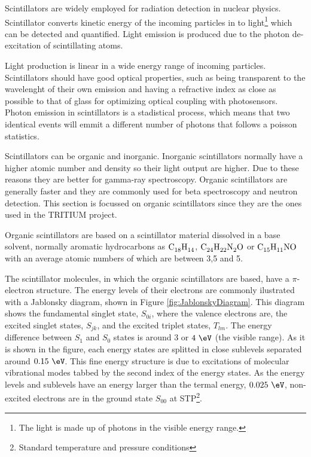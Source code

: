Scintillators are widely employed for radiation detection in nuclear physics. Scintillator converts kinetic energy of the incoming particles in to light\footnote{The light is made up of photons in the visible energy range.} which can be detected and quantified. Light emission is produced due to the photon de-excitation of scintillating atoms.

Light production is linear in a wide energy range of incoming particles. Scintillators should have good optical properties, such as being transparent to the wavelenght of their own emission and having a refractive index as close as possible to that of glass for optimizing optical coupling with photosensors. Photon emission in scintillators is a stadistical process, which means that two identical events will emmit a different number of photons that follows a poisson statistics.

Scintillators can be organic and inorganic. Inorganic scintillators normally have a higher atomic number and density so their light output are higher. Due to these reasons they are better for gamma-ray spectroscopy. Organic scintillators are generally faster and they are commonly used for beta spectroscopy and neutron detection. This section is focussed on organic scintillators since they are the ones used in the TRITIUM project. 

Organic scintillators are based on a scintillator material dissolved in a base solvent, normally aromatic hydrocarbons as $\ce{C_{18}H_{14}}$, $\ce{C_{24}H_{22}N_{2}O}$ or $\ce{C_{15}H_{11}NO}$ with an average atomic numbers of which are between 3,5 and 5.

The scintillator molecules, in which the organic scintillators are based, have a $\pi$-electron structure. The energy levels of their electrons are commonly ilustrated with a Jablonsky diagram, shown in Figure \ref{fig:JablonskyDiagram}. This diagram shows the fundamental singlet state, $S_{0i}$, where the valence electrons are, the excited singlet states, $S_{jk}$, and the excited triplet states, $T_{lm}$. The energy difference between $S_1$ and $S_0$ states is around $3$ or $4~\eV$ (the visible range). As it is shown in the figure, each energy states are splitted in close sublevels separated around $0.15~\eV$. This fine energy structure is due to excitations of molecular vibrational modes tabbed by the second index of the energy states. As the energy levels and sublevels have an energy larger than the termal energy, $0.025~\eV$, non-excited electrons are in the ground state $S_{00}$ at STP\footnote{Standard temperature and pressure conditions}.

